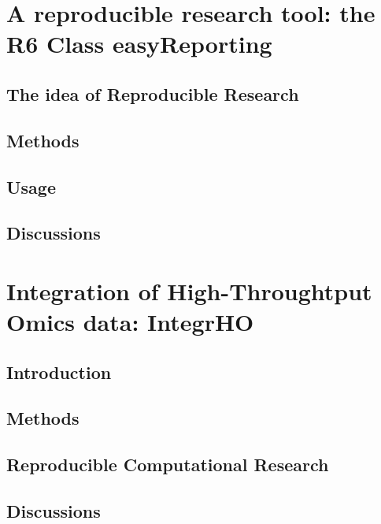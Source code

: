 \documentclass[b5paper, oneside, british, intoc, bibliograph=totoc, index=totoc, BCOR10mm, twoside, openright]{book}
\numberwithin{equation}{section}
\numberwithin{figure}{section}
\begin{document}

\chapter{A reproducible research tool: the R6 Class easyReporting}

\section{The idea of Reproducible Research}

\section{Methods}

\section{Usage}

\section{Discussions}



\chapter{Integration of High-Throughtput Omics data: IntegrHO} \label{sec:integrhocap}

\section{Introduction} \label{sec:integrhointro}

\section{Methods}  \label{sec:integrhometh}

\section{Reproducible Computational Research} \label{sec:integrhorr}

\section{Discussions} \label{sec:integrhofuture}

\end{document}
